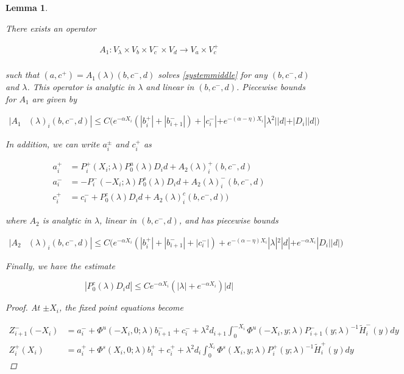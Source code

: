\documentclass[12pt]{article}
\newtheorem{lemma}{Lemma}
\begin{document}
\begin{lemma}\label{inv1}

There exists an operator

\begin{align*}
A_1: V_\lambda \times V_b \times V_c^- \times V_d \rightarrow V_a \times V_c^+\\
\end{align*}

such that $(a, c^+) = A_1(\lambda)(b, c^-,d)$ solves \eqref{systemmiddle} for any $(b, c^-,d)$ and $\lambda$. This operator is analytic in $\lambda$ and linear in $(b,c^-,d)$. Piecewise bounds for $A_1$ are given by

\begin{align}\label{A1bound}
|A_1&(\lambda)_i(b, c^-, d)|
\leq C \Big( e^{-\alpha X_i} (|b_i^+| + |b_{i+1}^-|) + |c_i^-| + e^{-(\alpha - \eta) X_i} |\lambda^2||d| + |D_i||d| \Big)
\end{align} 

In addition, we can write $a_i^\pm$ and $c_i^+$ as 

\begin{align*}
a_i^+ &= P_i^+(X_i; \lambda) P_0^u(\lambda) D_i d + A_2(\lambda)_i^+(b, c^-, d) \\
a_i^- &= -P_i^-(-X_i; \lambda) P_0^s(\lambda) D_i d + A_2(\lambda)_i^-(b, c^-, d) \\
c_i^+ &= c_i^- + P_0^c(\lambda) D_i d + A_2(\lambda)_i^c(b, c^-, d) )
\end{align*}

where $A_2$ is analytic in $\lambda$, linear in $(b, c^-, d)$, and has piecewise bounds

\begin{align*}
|A_2&(\lambda)_i(b, c^-, d)|
\leq C \Big( e^{-\alpha X_i} (|b_i^+| + |b_{i+1}^-| + |c_i^-|) + e^{-(\alpha - \eta) X_i} |\lambda|^2|d| + e^{-\alpha X_i} |D_i||d| \Big)
\end{align*}

Finally, we have the estimate

\begin{equation}\label{P0cDid}
|P_0^c(\lambda) D_i d| \leq C e^{-\alpha X_i}(|\lambda| + e^{-\alpha X_i})|d|
\end{equation}

\begin{proof}

At $\pm X_i$, the fixed point equations become

\begin{align*}
Z_{i+1}^-(-X_i) &= a_i^- + \Phi^u(-X_i, 0; \lambda) b_{i+1}^- + c_i^- 
+ \lambda^2 d_{i+1} \int_0^{-X_i} \Phi^u(-X_i, y; \lambda) P_{i+1}^-(y; \lambda)^{-1} \tilde{H}_i^-(y) dy \\
Z_i^+(X_i) &= a_i^+ + \Phi^s(X_i, 0; \lambda) b_i^+ + c_i^+ 
+ \lambda^2 d_i \int_0^{X_i} \Phi^s(X_i, y; \lambda) P_i^+(y; \lambda)^{-1} \tilde{H}_i^+(y) dy
\end{align*}


\end{proof}
\end{lemma}
\end{document}
